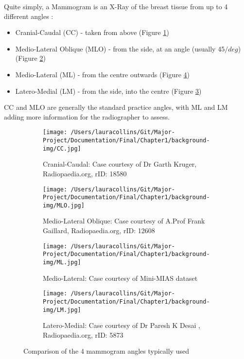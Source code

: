 Quite simply, a Mammogram is an X-Ray of the breast tissue from up to 4 different angles \cite{Radswiki} \cite{Mammography_views_Doc_2016}:
\begin{itemize}
  \item Cranial-Caudal (CC) - taken from above (Figure \ref{fig:CC})
  \item Medio-Lateral Oblique (MLO) - from the side, at an angle (usually 45$/deg$) (Figure \ref{fig:MLO})
  \item Medio-Lateral (ML) - from the centre outwards (Figure \ref{fig:ML})
  \item Latero-Medial (LM) - from the side, into the centre (Figure \ref{fig:LM})
\end{itemize}

CC and MLO are generally the standard practice angles, with ML and LM adding more information for the radiographer to assess.

\begin{figure}[!ht]
  \center
  \begin{subfigure}[ht!]{0.4\textwidth}
        \texttt{[image: /Users/lauracollins/Git/Major-Project/Documentation/Final/Chapter1/background-img/CC.jpg]}
        \caption{Cranial-Caudal: Case courtesy of Dr Garth Kruger, Radiopaedia.org, rID: 18580}
        \label{fig:CC}
    \end{subfigure}
    \hspace{\fill}
    \begin{subfigure}[ht!]{0.4\textwidth}
          \texttt{[image: /Users/lauracollins/Git/Major-Project/Documentation/Final/Chapter1/background-img/MLO.jpg]}
          \caption{Medio-Lateral Oblique: Case courtesy of A.Prof Frank Gaillard, Radiopaedia.org, rID: 12608}
          \label{fig:MLO}
    \end{subfigure}

    \begin{subfigure}[ht!]{0.4\textwidth}
          \texttt{[image: /Users/lauracollins/Git/Major-Project/Documentation/Final/Chapter1/background-img/ML.jpg]}
          \caption{Medio-Lateral: Case courtesy of Mini-MIAS dataset \cite{Suckling_1994}}
          \label{fig:LM}
    \end{subfigure}
    \hspace{\fill}
    \begin{subfigure}[ht!]{0.4\textwidth}
          \texttt{[image: /Users/lauracollins/Git/Major-Project/Documentation/Final/Chapter1/background-img/LM.jpg]}
          \caption{Latero-Medial: Case courtesy of Dr Paresh K Desai , Radiopaedia.org, rID: 5873}
          \label{fig:ML}
    \end{subfigure}
  \caption{Comparison of the 4 mammogram angles typically used}
  \label{fig:scan-angles}
\end{figure}

